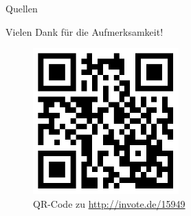 \documentclass[18pt]{beamer}
\begin{document}
    \appendix
    \beginbackup

    \begin{frame}[allowframebreaks]{Quellen}
    
    \end{frame}

    \backupend

    \begin{frame}{Vielen Dank für die Aufmerksamkeit!}
        \begin{figure}[]
            \centering
            \includegraphics[keepaspectratio, width=0.5\textwidth]{figures/qrcode.png}
            \caption{QR-Code zu \url{http://invote.de/15949}}
        \end{figure}
        
    
    \end{frame}
\end{document}
